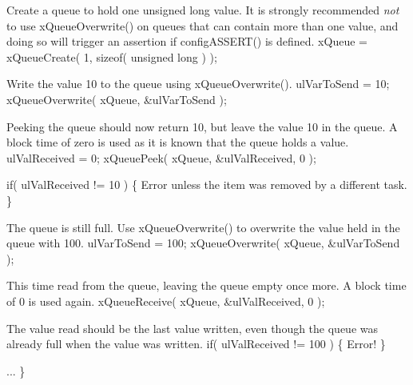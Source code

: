 \begin{DoxyPre}Create a queue to hold one unsigned long value.  It is strongly
recommended {\itshape not} to use xQueueOverwrite() on queues that can
contain more than one value, and doing so will trigger an assertion
if configASSERT() is defined.
        xQueue = xQueueCreate( 1, sizeof( unsigned long ) );\end{DoxyPre}



\begin{DoxyPre}Write the value 10 to the queue using xQueueOverwrite().
        ulVarToSend = 10;
        xQueueOverwrite( xQueue, &ulVarToSend );\end{DoxyPre}



\begin{DoxyPre}Peeking the queue should now return 10, but leave the value 10 in
the queue.  A block time of zero is used as it is known that the
queue holds a value.
        ulValReceived = 0;
        xQueuePeek( xQueue, &ulValReceived, 0 );\end{DoxyPre}



\begin{DoxyPre}        if( ulValReceived != 10 )
        \{
Error unless the item was removed by a different task.
        \}\end{DoxyPre}



\begin{DoxyPre}The queue is still full.  Use xQueueOverwrite() to overwrite the
value held in the queue with 100.
        ulVarToSend = 100;
        xQueueOverwrite( xQueue, &ulVarToSend );\end{DoxyPre}



\begin{DoxyPre}This time read from the queue, leaving the queue empty once more.
A block time of 0 is used again.
        xQueueReceive( xQueue, &ulValReceived, 0 );\end{DoxyPre}



\begin{DoxyPre}The value read should be the last value written, even though the
queue was already full when the value was written.
        if( ulValReceived != 100 )
        \{
Error!
        \}\end{DoxyPre}



\begin{DoxyPre}...
\}
 \end{DoxyPre}
 